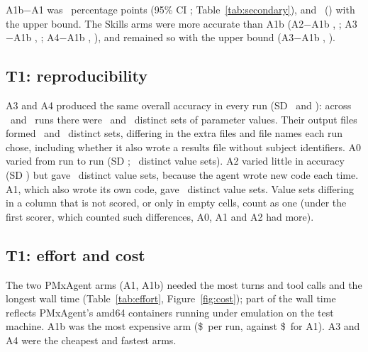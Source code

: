 \documentclass[11pt]{article}
\begin{document}
A1b$-$A1 was \numToneAonebVsAoneSecondaryDiff\ percentage points (95\% CI \numToneAonebVsAoneSecondaryCI;
Table~\ref{tab:secondary}), and \numToneAonebVsAoneFavourableDiff\ (\numToneAonebVsAoneFavourableCI) with the upper
bound. The Skills arms were more accurate than A1b (A2$-$A1b \numToneAtwoVsAonebSecondaryDiff,
\numToneAtwoVsAonebSecondaryCI; A3$-$A1b \numToneAthreeVsAonebSecondaryDiff, \numToneAthreeVsAonebSecondaryCI;
A4$-$A1b \numToneAfourVsAonebSecondaryDiff, \numToneAfourVsAonebSecondaryCI), and remained so with the upper bound
(A3$-$A1b \numToneAthreeVsAonebFavourableDiff, \numToneAthreeVsAonebFavourableCI).

\begin{table}[t]
\centering\small
\caption{T1 secondary arm A1b (post hoc): comparisons of overall accuracy, as in Table~\ref{tab:stats}.}
\label{tab:secondary}

\end{table}

\subsection{T1: reproducibility}
A3 and A4 produced the same overall accuracy in every run (SD \numToneAthreeAccSD\ and \numToneAfourAccSD): across
\numToneAthreeN\ and \numToneAfourN\ runs there were \numToneAthreeDistinct\ and \numToneAfourDistinct\ distinct sets
of parameter values. Their output files formed \numToneAthreeDistinctFiles\ and \numToneAfourDistinctFiles\ distinct
sets, differing in the extra files and file names each run chose, including whether it also wrote a results file
without subject identifiers. A0 varied from run to run (SD \numToneAzeroAccSD; \numToneAzeroDistinct\ distinct value
sets). A2 varied little in accuracy (SD \numToneAtwoAccSD) but gave \numToneAtwoDistinct\ distinct value sets, because
the agent wrote new code each time. A1, which also wrote its own code, gave \numToneAoneDistinct\ distinct value sets.
Value sets differing in a column that is not scored, or only in empty cells, count as one (under the first scorer,
which counted such differences, A0, A1 and A2 had more).

\subsection{T1: effort and cost}
The two PMxAgent arms (A1, A1b) needed the most turns and tool calls and the longest wall time (Table~\ref{tab:effort},
Figure~\ref{fig:cost}); part of the wall time reflects PMxAgent's amd64 containers running under emulation on the test
machine. A1b was the most expensive arm (\$\numToneAonebCost\ per run, against \$\numToneAoneCost\ for A1). A3 and A4
were the cheapest and fastest arms.
\end{document}
